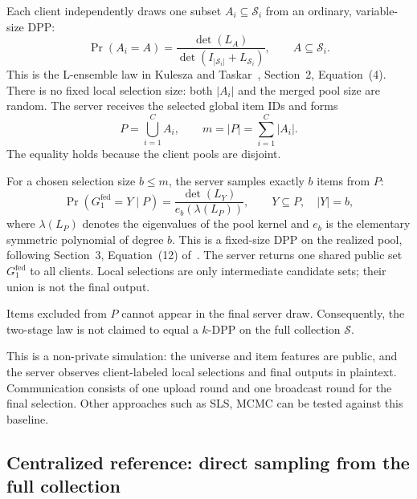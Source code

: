 \documentclass[11pt]{article}
\newcommand{\card}[1]{\left\lvert#1\right\rvert}
\begin{document}
Each client independently draws one subset $A_i\subseteq\mathcal{S}_i$
from an ordinary, variable-size DPP:
\begin{equation}
  \Pr(A_i=A)
  =\frac{\det(L_A)}{\det(I_{\card{\mathcal{S}_i}}+L_{\mathcal{S}_i})},
  \qquad A\subseteq\mathcal{S}_i.
  \label{eq:baseline-local-dpp}
\end{equation}
This is the L-ensemble law in Kulesza and Taskar~\cite{kulesza2011},
Section~2, Equation~(4). There is no fixed local selection size: both
$\card{A_i}$ and the merged pool size are random. The server receives the
selected global item IDs and forms
\begin{equation}
  P=\bigcup_{i=1}^{C} A_i,
  \qquad m=\card{P}=\sum_{i=1}^{C}\card{A_i}.
  \label{eq:baseline-pool}
\end{equation}
The equality holds because the client pools are disjoint.

For a chosen selection size $b\le m$, the server samples exactly $b$ items from $P$:
\begin{equation}
  \Pr(G_1^{\mathrm{fed}}=Y\mid P)
  =\frac{\det(L_Y)}{e_b(\lambda(L_P))},
  \qquad Y\subseteq P,\quad \card{Y}=b,
  \label{eq:baseline-server-kdpp}
\end{equation}
where $\lambda(L_P)$ denotes the eigenvalues of the pool kernel and $e_b$
is the elementary symmetric polynomial of degree $b$. This is a fixed-size
DPP on the realized pool, following Section~3, Equation~(12)
of~\cite{kulesza2011}. The server returns one shared public set
$G_1^{\mathrm{fed}}$ to all clients. Local selections are only intermediate
candidate sets; their union is not the final output.

Items excluded from $P$ cannot appear in the final server draw.
Consequently, the two-stage law is
not claimed to equal a $k$-DPP on the full collection $\mathcal{S}$.

This is a non-private simulation: the universe and item features are public,
and the server observes client-labeled local selections and final outputs
in plaintext. Communication consists of one upload round and one
broadcast round for the final selection. Other approaches such as SLS, MCMC can be tested against this baseline. 

\subsection{Centralized reference: direct sampling from the full collection}
\end{document}
